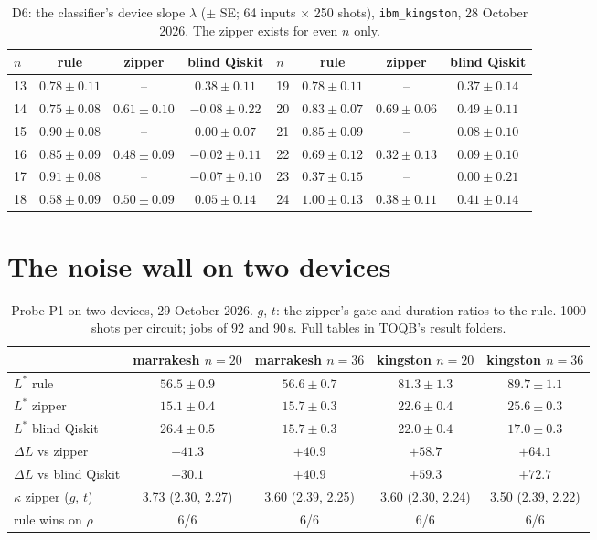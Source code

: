 \documentclass[11pt]{article}
\begin{document}
\begin{table}[h]
\centering
\small
\begin{tabular}{lccc|lccc}
\toprule
$n$ & rule & zipper & blind Qiskit & $n$ & rule & zipper & blind Qiskit\\
\midrule
13 & $0.78\pm0.11$ & -- & $0.38\pm0.11$ & 19 & $0.78\pm0.11$ & -- & $0.37\pm0.14$\\
14 & $0.75\pm0.08$ & $0.61\pm0.10$ & $-0.08\pm0.22$ & 20 & $0.83\pm0.07$ & $0.69\pm0.06$ & $0.49\pm0.11$\\
15 & $0.90\pm0.08$ & -- & $0.00\pm0.07$ & 21 & $0.85\pm0.09$ & -- & $0.08\pm0.10$\\
16 & $0.85\pm0.09$ & $0.48\pm0.09$ & $-0.02\pm0.11$ & 22 & $0.69\pm0.12$ & $0.32\pm0.13$ & $0.09\pm0.10$\\
17 & $0.91\pm0.08$ & -- & $-0.07\pm0.10$ & 23 & $0.37\pm0.15$ & -- & $0.00\pm0.21$\\
18 & $0.58\pm0.09$ & $0.50\pm0.09$ & $0.05\pm0.14$ & 24 & $1.00\pm0.13$ & $0.38\pm0.11$ & $0.41\pm0.14$\\
\bottomrule
\end{tabular}
\caption{D6: the classifier's device slope $\lambda$ ($\pm$ SE; 64 inputs $\times$ 250 shots), \texttt{ibm\_kingston},
28 October 2026. The zipper exists for even $n$ only.}\label{tab:d6}
\end{table}

\section{The noise wall on two devices}

\begin{table}[h]
\centering
\small
\begin{tabular}{lcccc}
\toprule
 & marrakesh $n=20$ & marrakesh $n=36$ & kingston $n=20$ & kingston $n=36$\\
\midrule
$L^*$ rule & $56.5\pm0.9$ & $56.6\pm0.7$ & $81.3\pm1.3$ & $89.7\pm1.1$\\
$L^*$ zipper & $15.1\pm0.4$ & $15.7\pm0.3$ & $22.6\pm0.4$ & $25.6\pm0.3$\\
$L^*$ blind Qiskit & $26.4\pm0.5$ & $15.7\pm0.3$ & $22.0\pm0.4$ & $17.0\pm0.3$\\
$\Delta L$ vs zipper & $+41.3$ & $+40.9$ & $+58.7$ & $+64.1$\\
$\Delta L$ vs blind Qiskit & $+30.1$ & $+40.9$ & $+59.3$ & $+72.7$\\
$\kappa$ zipper ($g$, $t$) & 3.73 (2.30, 2.27) & 3.60 (2.39, 2.25) & 3.60 (2.30, 2.24) & 3.50 (2.39, 2.22)\\
rule wins on $\rho$ & 6/6 & 6/6 & 6/6 & 6/6\\
\bottomrule
\end{tabular}
\caption{Probe P1 on two devices, 29 October 2026. $g$, $t$: the zipper's gate and duration ratios to the rule. 1000 shots per circuit; jobs of 92 and 90\,s.
Full tables in TOQB's result folders.}
\end{table}
\end{document}
